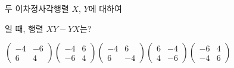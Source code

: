 \hspace*{2mm}\begin{minipage}[t]{\dimexpr\linewidth-2mm\relax}\vspace{0pt}
두 이차정사각행렬 $X$, $Y$에 대하여 \par\smallskip{}\par\smallskip\noindent 일 때, 행렬 $XY-YX$는?
\begin{choices32}{$\begin{pmatrix} -4 & -6 \\ 6 & 4 \end{pmatrix}$}{$\begin{pmatrix} -4 & 6 \\ -6 & 4 \end{pmatrix}$}{$\begin{pmatrix} -4 & 6 \\ 6 & -4 \end{pmatrix}$}{$\begin{pmatrix} 6 & -4 \\ 4 & -6 \end{pmatrix}$}{$\begin{pmatrix} -6 & 4 \\ -4 & 6 \end{pmatrix}$}\end{choices32}\end{minipage}
